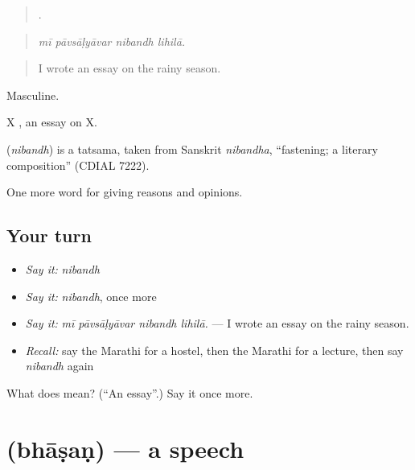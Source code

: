 \begin{quote}
   .
\end{quote}

\begin{quote}
\emph{mī pāvsāḷyāvar nibandh lihilā.}
\end{quote}

\begin{quote}
I wrote an essay on the rainy season.
\end{quote}

Masculine.

X  , an essay on X.

\begin{cousinweb}
\textbf{} (\emph{nibandh}) is a tatsama, taken from Sanskrit \emph{nibandha}, \textquotedblleft{}fastening; a literary composition\textquotedblright{} (CDIAL 7222).
\end{cousinweb}

\begin{grammarlens}[title={What you've built}]
One more word for giving reasons and opinions.
\end{grammarlens}

\subsection*{Your turn}
\begin{itemize}
\raggedright
  \item \emph{Say it:} \emph{nibandh}
  \item \emph{Say it:} \emph{nibandh}, once more
  \item \emph{Say it:} \emph{mī pāvsāḷyāvar nibandh lihilā.} — I wrote an essay on the rainy season.
  \item \emph{Recall:} say the Marathi for a hostel, then the Marathi for a lecture, then say \emph{nibandh} again
\end{itemize}

\begin{tcolorbox}[breakable,colback=teal!4,colframe=teal!35!black,title={Before you move on}]
What does  mean? (\textquotedblleft{}An essay\textquotedblright{}.) Say it once more.
\end{tcolorbox}
\section[\texorpdfstring{\mr{भाषण} (bhāṣaṇ)}{भाषण (bhāṣaṇ)}]{ (bhāṣaṇ) — a speech}

